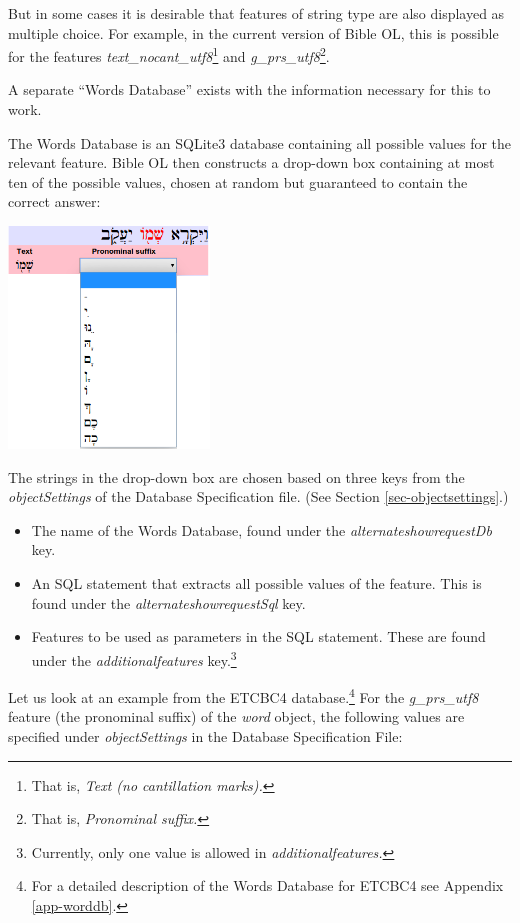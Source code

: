 \documentclass[11pt,oneside,a4paper]{memoir}
\begin{document}
But in some cases it is desirable that features of string type are also displayed as multiple
choice. For example, in the current version of Bible OL, this is possible for the features
\emph{text\_nocant\_utf8}\footnote{That is, \emph{Text (no cantillation marks).}} and
\emph{g\_prs\_utf8}\footnote{That is, \emph{Pronominal suffix.}}.

A separate ``Words Database'' exists with the information necessary for this to work.

The Words Database is an SQLite3 database containing all possible values for the relevant feature.
Bible OL then constructs a drop-down box containing at most ten of the possible values, chosen at
random but guaranteed to contain the correct answer:

\begin{center}
  \includegraphics[width=0.4\textwidth]{pronsuf.png}
\end{center}

The strings in the drop-down box are chosen based on three keys from the \emph{objectSettings} of
the Database Specification file. (See Section \ref{sec-objectsettings}.)

\begin{itemize}
\item The name of the Words Database, found under the \emph{alternateshowrequestDb} key.
\item An SQL statement that extracts all possible values of the feature. This is found under the
  \emph{alternateshowrequestSql} key.
\item Features to be used as parameters in the SQL statement. These are found under the
  \emph{additionalfeatures} key.\footnote{Currently, only one value is allowed in \emph{additionalfeatures.}}
\end{itemize}


Let us look at an example from the ETCBC4 database.\footnote{For a detailed description of the Words
Database for ETCBC4 see Appendix \ref{app-worddb}.} For the \emph{g\_prs\_utf8} feature (the
pronominal suffix) of the \emph{word} object, the following values are specified under
\emph{objectSettings} in the Database Specification File:
\end{document}
